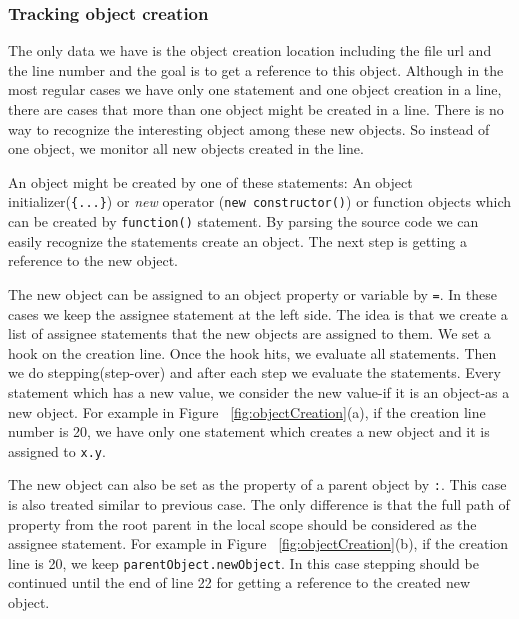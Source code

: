 \documentclass[preprint]{sigplanconf}
\begin{document}
 
\subsubsection{Tracking object creation}
The only data we have is the object creation location including the
file url and the line number and the goal is to get a reference to
this object. Although in the most regular cases we have only one
statement and one object creation in a line, there are cases that more
than one object might be created in a line. There is no way to
recognize the interesting object among these new objects. So instead
of one object, we monitor all new objects created in the line.

An object might be created by one of these statements: An object
initializer(\texttt{\{...\}}) or \textit{new} operator (\texttt{new
  constructor()}) or function objects which can be created by
\texttt{function()} statement. By parsing the source code we can
easily recognize the statements create an object. The next step is
getting a reference to the new object.

The new object can be assigned to an object property or variable by
\texttt{=}. In these cases we keep the assignee statement at the left
side. The idea is that we create a list of assignee statements that
the new objects are assigned to them. We set a hook on the creation
line. Once the hook hits, we evaluate all statements. Then we do
stepping(step-over) and after each step we evaluate the
statements. Every statement which has a new value, we consider the new
value-if it is an object-as a new object. For example in Figure
~\ref{fig:objectCreation}(a), if the creation line number is 20, we
have only one statement which creates a new object and it is assigned
to \texttt{x.y}.

The new object can also be set as the property of a parent object by
\texttt{:}. This case is also treated similar to previous case. The
only difference is that the full path of property from the root parent
in the local scope should be considered as the assignee statement. For
example in Figure ~\ref{fig:objectCreation}(b), if the creation line
is 20, we keep \texttt{parentObject.newObject}. In this case stepping
should be continued until the end of line 22 for getting a reference
to the created new object.
\end{document}
